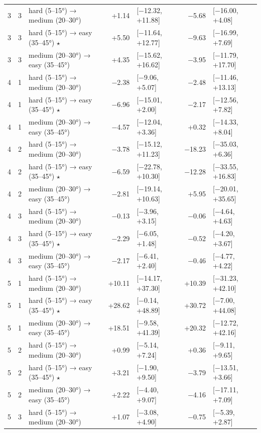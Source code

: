 \begin{table}[htbp]
\begin{tabular}{rllrlrl}
    3 & 3 & hard (5–15°) → medium (20–30°) & +1.14 & [−12.32, +11.88] & −5.68 & [−16.00, +4.08] \\
    3 & 3 & hard (5–15°) → easy (35–45°) $\star$ & +5.50 & [−11.64, +12.77] & −9.63 & [−16.99, +7.69] \\
    3 & 3 & medium (20–30°) → easy (35–45°) & +4.35 & [−15.62, +16.62] & −3.95 & [−11.79, +17.70] \\
    4 & 1 & hard (5–15°) → medium (20–30°) & −2.38 & [−9.06, +5.07] & −2.48 & [−11.46, +13.13] \\
    4 & 1 & hard (5–15°) → easy (35–45°) $\star$ & −6.96 & [−15.01, +2.00] & −2.17 & [−12.56, +7.82] \\
    4 & 1 & medium (20–30°) → easy (35–45°) & −4.57 & [−12.04, +3.36] & +0.32 & [−14.33, +8.04] \\
    4 & 2 & hard (5–15°) → medium (20–30°) & −3.78 & [−15.12, +11.23] & −18.23 & [−35.03, +6.36] \\
    4 & 2 & hard (5–15°) → easy (35–45°) $\star$ & −6.59 & [−22.78, +10.30] & −12.28 & [−33.55, +16.83] \\
    4 & 2 & medium (20–30°) → easy (35–45°) & −2.81 & [−19.14, +10.63] & +5.95 & [−20.01, +35.65] \\
    4 & 3 & hard (5–15°) → medium (20–30°) & −0.13 & [−3.96, +3.15] & −0.06 & [−4.64, +4.63] \\
    4 & 3 & hard (5–15°) → easy (35–45°) $\star$ & −2.29 & [−6.05, +1.48] & −0.52 & [−4.20, +3.67] \\
    4 & 3 & medium (20–30°) → easy (35–45°) & −2.17 & [−6.41, +2.40] & −0.46 & [−4.77, +4.22] \\
    5 & 1 & hard (5–15°) → medium (20–30°) & +10.11 & [−14.17, +37.30] & +10.39 & [−31.23, +42.10] \\
    5 & 1 & hard (5–15°) → easy (35–45°) $\star$ & +28.62 & [−0.14, +48.89] & +30.72 & [−7.00, +44.08] \\
    5 & 1 & medium (20–30°) → easy (35–45°) & +18.51 & [−9.58, +41.39] & +20.32 & [−12.72, +42.16] \\
    5 & 2 & hard (5–15°) → medium (20–30°) & +0.99 & [−5.14, +7.24] & +0.36 & [−9.11, +9.65] \\
    5 & 2 & hard (5–15°) → easy (35–45°) $\star$ & +3.21 & [−1.90, +9.50] & −3.79 & [−13.51, +3.66] \\
    5 & 2 & medium (20–30°) → easy (35–45°) & +2.22 & [−4.40, +9.07] & −4.16 & [−17.11, +7.09] \\
    5 & 3 & hard (5–15°) → medium (20–30°) & +1.07 & [−3.08, +4.90] & −0.75 & [−5.39, +2.87] \\

\end{tabular}
\end{table}
